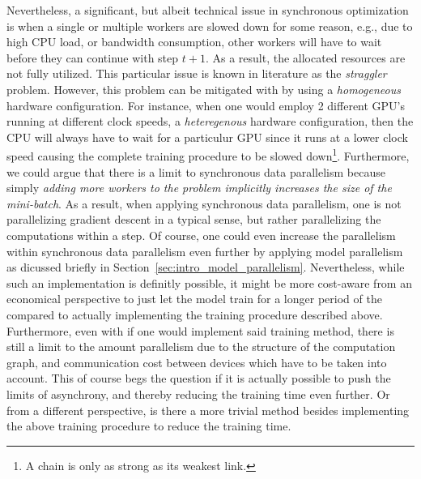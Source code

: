 Nevertheless, a significant, but albeit technical issue in synchronous optimization is when a single or multiple workers are slowed down for some reason, e.g., due to high CPU load, or bandwidth consumption, other workers will have to wait before they can continue with step $t + 1$. As a result, the allocated resources are not fully utilized. This particular issue is known in literature as the \emph{straggler} problem. However, this problem can be mitigated with by using a \emph{homogeneous} hardware configuration. For instance, when one would employ 2 different GPU's running at different clock speeds, a \emph{heteregenous} hardware configuration, then the CPU will always have to wait for a particulur GPU since it runs at a lower clock speed causing the complete training procedure to be slowed down\footnote{A chain is only as strong as its weakest link.}. Furthermore, we could argue that there is a limit to synchronous data parallelism because simply \emph{adding more workers to the problem implicitly increases the size of the mini-batch}. As a result, when applying synchronous data parallelism, one is not parallelizing gradient descent in a typical sense, but rather parallelizing the computations within a step. Of course, one could even increase the parallelism within synchronous data parallelism even further by applying model parallelism as dicussed briefly in Section~\ref{sec:intro_model_parallelism}. Nevertheless, while such an implementation is definitly possible, it might be more cost-aware from an economical perspective to just let the model train for a longer period of the compared to actually implementing the training procedure described above. Furthermore, even with if one would implement said training method, there is still a limit to the amount parallelism due to the structure of the computation graph, and communication cost between devices which have to be taken into account. This of course begs the question if it is actually possible to push the limits of asynchrony, and thereby reducing the training time even further. Or from a different perspective, is there a more trivial method besides implementing the above training procedure to reduce the training time.\\

